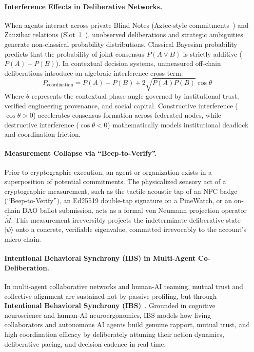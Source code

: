 \documentclass[a4paper,11pt,twoside,parskip=half-,headings=small]{scrartcl}
\begin{document}
\paragraph{Interference Effects in Deliberative Networks.}
When agents interact across private Blind Notes (Aztec-style commitments~\cite{williamson2022aztec,pedersen1991commitment}) and Zanzibar relations (Slot~1~\cite{pang2019zanzibar}), unobserved deliberations and strategic ambiguities generate non-classical probability distributions. Classical Bayesian probability predicts that the probability of joint consensus $P(A \lor B)$ is strictly additive ($P(A) + P(B)$). In contextual decision systems, unmeasured off-chain deliberations introduce an algebraic interference cross-term:
\begin{equation}
  P_{\text{coordination}} = P(A) + P(B) + 2\sqrt{P(A)P(B)} \cos \theta
  \label{eq:quantum_interference}
\end{equation}
Where $\theta$ represents the contextual phase angle governed by institutional trust, verified engineering provenance, and social capital. Constructive interference ($\cos \theta > 0$) accelerates consensus formation across federated nodes, while destructive interference ($\cos \theta < 0$) mathematically models institutional deadlock and coordination friction.

\paragraph{Measurement Collapse via ``Beep-to-Verify''.}
Prior to cryptographic execution, an agent or organization exists in a superposition of potential commitments. The physicalized sensory act of a cryptographic measurement, such as the tactile acoustic tap of an NFC badge (``Beep-to-Verify''), an Ed25519 double-tap signature on a PineWatch, or an on-chain DAO ballot submission, acts as a formal von Neumann projection operator $\hat{M}$. This measurement irreversibly projects the indeterminate deliberative state $|\psi\rangle$ onto a concrete, verifiable eigenvalue, committed irrevocably to the account's micro-chain.

\paragraph{Intentional Behavioral Synchrony (IBS) in Multi-Agent Co-Deliberation.}
In multi-agent collaborative networks and human-AI teaming, mutual trust and collective alignment are sustained not by passive profiling, but through \textbf{Intentional Behavioral Synchrony (IBS)}~\cite{naser2023intentional}. Grounded in cognitive neuroscience and human-AI neuroergonomics, IBS models how living collaborators and autonomous AI agents build genuine rapport, mutual trust, and high coordination efficacy by deliberately attuning their action dynamics, deliberative pacing, and decision cadence in real time.
\end{document}
